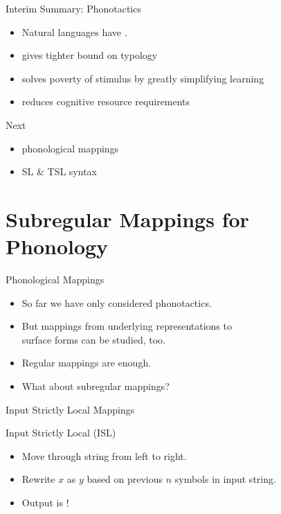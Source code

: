 \documentclass[xcolor={usenames,svgnames,x11names,table}]{beamer}
\begin{document}
\begin{frame}{Interim Summary: Phonotactics}
    \begin{itemize}
        \item Natural languages have . 
        \item gives tighter bound on typology
        \item solves poverty of stimulus by greatly simplifying learning
        \item reduces cognitive resource requirements
    \end{itemize}

    \pause
    \begin{block}{Next}
        \begin{itemize}
            \item phonological mappings
            \item SL \& TSL syntax
        \end{itemize}
    \end{block}
\end{frame}

\section[Mappings]{Subregular Mappings for Phonology}

\begin{frame}{Phonological Mappings}
    \begin{itemize}
        \item So far we have only considered phonotactics.
        \item But mappings from underlying representations to\\
            surface forms can be studied, too.
        \item Regular mappings are enough.\\
        \item What about subregular mappings?
    \end{itemize}
\end{frame}

\begin{frame}{Input Strictly Local Mappings}
    \begin{block}{Input Strictly Local (ISL)}
        \begin{itemize}
            \item Move through string from left to right.
            \item Rewrite $x$ as $y$ based on previous $n$ symbols in input string.
            \item Output is !
        \end{itemize}
    \end{block}
\end{frame}
\end{document}

